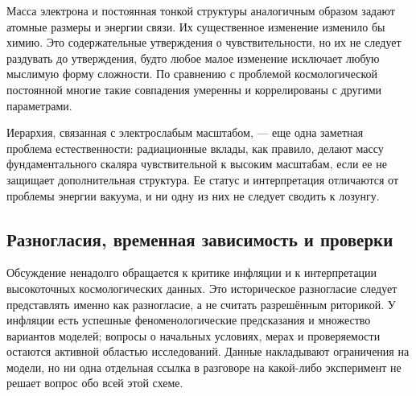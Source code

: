 Масса электрона и постоянная тонкой структуры аналогичным образом задают атомные размеры и энергии связи. Их существенное изменение изменило бы химию. Это содержательные утверждения о чувствительности, но их не следует раздувать до утверждения, будто любое малое изменение исключает любую мыслимую форму сложности. По сравнению с проблемой космологической постоянной многие такие совпадения умеренны и коррелированы с другими параметрами.

Иерархия, связанная с электрослабым масштабом, — еще одна заметная проблема естественности: радиационные вклады, как правило, делают массу фундаментального скаляра чувствительной к высоким масштабам, если ее не защищает дополнительная структура. Ее статус и интерпретация отличаются от проблемы энергии вакуума, и ни одну из них не следует сводить к лозунгу.

\begin{classroomqa}
\end{classroomqa}

\begin{classroomqa}
\end{classroomqa}

\subsection{Разногласия, временная зависимость и проверки}

Обсуждение ненадолго обращается к критике инфляции и к интерпретации высокоточных космологических данных. Это историческое разногласие следует представлять именно как разногласие, а не считать разрешённым риторикой. У инфляции есть успешные феноменологические предсказания и множество вариантов моделей; вопросы о начальных условиях, мерах и проверяемости остаются активной областью исследований. Данные накладывают ограничения на модели, но ни одна отдельная ссылка в разговоре на какой-либо эксперимент не решает вопрос обо всей этой схеме.

